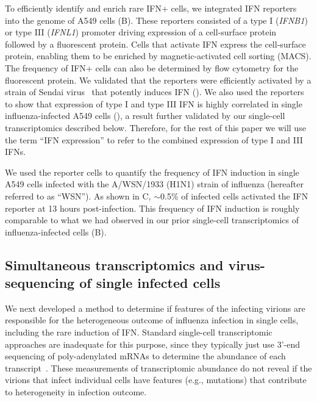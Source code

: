 \documentclass[9pt,lineno]{elife}
\begin{document}
To efficiently identify and enrich rare IFN+ cells, we integrated IFN reporters into the genome of A549 cells (B).
These reporters consisted of a type I (\textit{IFNB1}) or type III (\textit{IFNL1}) promoter driving expression of a cell-surface protein~\citep[LNGFR$\Delta$C;][]{bonini1997hsv,ruggieri1997cell} followed by a fluorescent protein.
Cells that activate IFN express the cell-surface protein, enabling them to be enriched by magnetic-activated cell sorting (MACS).
The frequency of IFN+ cells can also be determined by flow cytometry for the fluorescent protein.
We validated that the reporters were efficiently activated by a strain of Sendai virus~\citep{strahle2006sendai} that potently induces IFN ().
We also used the reporters to show that expression of type I and type III IFN is highly correlated in single influenza-infected A549 cells (), a result further validated by our single-cell transcriptomics described below.
Therefore, for the rest of this paper we will use the term ``IFN expression'' to refer to the combined expression of type I and III IFNs. 

We used the reporter cells to quantify the frequency of IFN induction in single A549 cells infected with the A/WSN/1933 (H1N1) strain of influenza (hereafter referred to as ``WSN'').
As shown in C, $\sim$0.5\% of infected cells activated the IFN reporter at 13 hours post-infection.
This frequency of IFN induction is roughly comparable to what we had observed in our prior single-cell transcriptomics of influenza-infected cells (B).

\subsection{Simultaneous transcriptomics and virus-sequencing of single infected cells}
We next developed a method to determine if features of the infecting virions are responsible for the heterogeneous outcome of influenza infection in single cells, including the rare induction of IFN.
Standard single-cell transcriptomic approaches are inadequate for this purpose, since they typically just use 3'-end sequencing of poly-adenylated mRNAs to determine the abundance of each transcript~\citep{klein2015droplet, macosko2015highly, zheng2017massively, cao2017comprehensive, gierahn2017seq}.
These measurements of transcriptomic abundance do not reveal if the virions that infect individual cells have features (e.g., mutations) that contribute to heterogeneity in infection outcome. 
\end{document}
